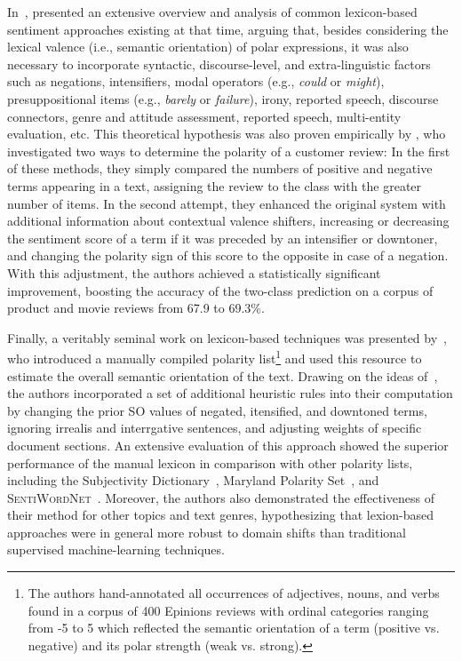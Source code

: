 In~\citeyear{Polanyi:06}, \citeauthor{Polanyi:06} presented an
extensive overview and analysis of common lexicon-based sentiment
approaches existing at that time, arguing that, besides considering
the lexical valence (i.e., semantic orientation) of polar expressions,
it was also necessary to incorporate syntactic, discourse-level, and
extra-linguistic factors such as negations, intensifiers, modal
operators (e.g., \emph{could} or \emph{might}), presuppositional items
(e.g., \emph{barely} or \emph{failure}), irony, reported speech,
discourse connectors, genre and attitude assessment, reported speech,
multi-entity evaluation, etc.  This theoretical hypothesis was also
proven empirically by \citet{Kennedy:06}, who investigated two ways to
determine the polarity of a customer review: In the first of these
methods, they simply compared the numbers of positive and negative
terms appearing in a text, assigning the review to the class with the
greater number of items.  In the second attempt, they enhanced the
original system with additional information about contextual valence
shifters, increasing or decreasing the sentiment score of a term if it
was preceded by an intensifier or downtoner, and changing the polarity
sign of this score to the opposite in case of a negation.  With this
adjustment, the authors achieved a statistically significant
improvement, boosting the accuracy of the two-class prediction on a
corpus of product and movie reviews from 67.9 to 69.3\%.

Finally, a veritably seminal work on lexicon-based techniques was
presented by~\citet{Taboada:11}, who introduced a manually compiled
polarity list\footnote{The authors hand-annotated all occurrences of
  adjectives, nouns, and verbs found in a corpus of 400 Epinions
  reviews with ordinal categories ranging from -5 to 5 which reflected
  the semantic orientation of a term (positive vs. negative) and its
  polar strength (weak vs. strong).} and used this resource to
estimate the overall semantic orientation of the text.  Drawing on the
ideas of~\citet{Polanyi:06}, the authors incorporated a set of
additional heuristic rules into their computation by changing the
prior SO values of negated, itensified, and downtoned terms, ignoring
irrealis and interrgative sentences, and adjusting weights of specific
document sections.  An extensive evaluation of this approach showed
the superior performance of the manual lexicon in comparison with
other polarity lists, including the Subjectivity
Dictionary~\cite{Wilson:05}, Maryland Polarity Set~\cite{Mohammad:09},
and \textsc{SentiWordNet}~\cite{Esuli:06c}.  Moreover, the authors
also demonstrated the effectiveness of their method for other topics
and text genres, hypothesizing that lexion-based approaches were in
general more robust to domain shifts than traditional supervised
machine-learning techniques.

